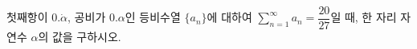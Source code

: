 첫째항이 $0.\dot{\alpha}$, 공비가 $0.\alpha$인 등비수열 $\{a_n\}$에 대하여 $\displaystyle\sum_{n=1}^{\infty} a_n=\dfrac{20}{27}$일 때, 한 자리 자연수 $\alpha$의 값을 구하시오.
